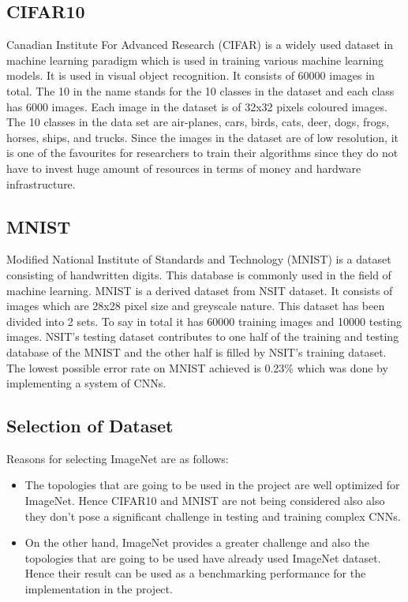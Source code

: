 \documentclass[titlepage]{report}
\begin{document}
\subsection{CIFAR10}
Canadian Institute For Advanced Research (CIFAR) is a widely used dataset in machine learning paradigm which is used in training various machine learning models. It is used in visual object recognition. It consists of 60000 images in total. The 10 in the name stands for the 10 classes in the dataset and each class has 6000 images. Each image in the dataset is of 32x32 pixels coloured images. The 10 classes in the data set are air-planes, cars, birds, cats, deer, dogs, frogs, horses, ships, and trucks. Since the images in the dataset are of low resolution, it is one of the favourites for researchers to train their algorithms since they do not have to invest huge amount of resources in terms of money and hardware infrastructure. 

\subsection{MNIST}
Modified National Institute of Standards and Technology (MNIST) is a dataset consisting of handwritten digits. This database is commonly used in the field of machine learning. MNIST is a derived dataset from NSIT dataset. It consists of images which are 28x28 pixel size and greyscale nature. This dataset has been divided into 2 sets. To say in total it has 60000 training images and 10000 testing images. NSIT's testing dataset contributes to one half of the training and testing database of the MNIST and the other half is filled by NSIT's training dataset. The lowest possible error rate on MNIST achieved is 0.23\%
which was done by implementing a system of CNNs.

\subsection{Selection of Dataset}
Reasons for selecting ImageNet are as follows:
\begin{itemize}
    \item The topologies that are going to be used in the project are well optimized for ImageNet. Hence CIFAR10 and MNIST are not being considered also also they don't pose a significant challenge in testing and training complex CNNs.
    \item On the other hand, ImageNet provides a greater challenge and also the topologies that are going to be used have already used ImageNet dataset. Hence their result can be used as a benchmarking performance for the implementation in the project.
\end{itemize}
\end{document}
